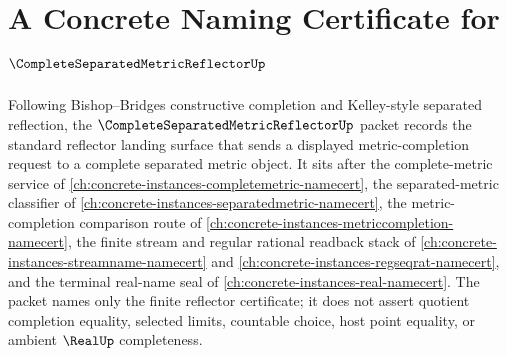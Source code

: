 \chapter{A Concrete Naming Certificate for $\CompleteSeparatedMetricReflectorUp$}
\label{ch:concrete-instances-complete-separated-metric-reflector-namecert}

Following Bishop--Bridges constructive completion and Kelley-style separated reflection, the $\CompleteSeparatedMetricReflectorUp$ packet records the standard reflector landing surface that sends a displayed metric-completion request to a complete separated metric object. It sits after the complete-metric service of \autoref{ch:concrete-instances-completemetric-namecert}, the separated-metric classifier of \autoref{ch:concrete-instances-separatedmetric-namecert}, the metric-completion comparison route of \autoref{ch:concrete-instances-metriccompletion-namecert}, the finite stream and regular rational readback stack of \autoref{ch:concrete-instances-streamname-namecert} and \autoref{ch:concrete-instances-regseqrat-namecert}, and the terminal real-name seal of \autoref{ch:concrete-instances-real-namecert}. The packet names only the finite reflector certificate; it does not assert quotient completion equality, selected limits, countable choice, host point equality, or ambient $\RealUp$ completeness.

